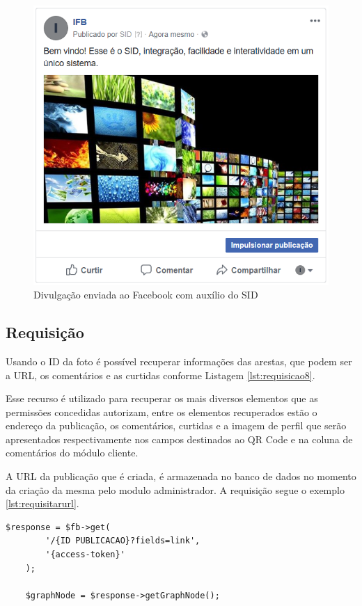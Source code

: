 \begin{figure}[H]
\centering
\includegraphics[scale=0.8]{figuras/imgfacebook1}
\caption{Divulgação enviada ao Facebook com auxílio do SID}
\label{fig:imgfacebook1}
\end{figure}


\subsection{Requisição}
Usando o ID da foto é possível recuperar informações das arestas, que podem ser a URL, os comentários e as curtidas conforme Listagem \ref{lst:requisicao8}. 

Esse recurso é utilizado para recuperar os mais diversos elementos que as permissões concedidas autorizam, entre os elementos recuperados estão o endereço da publicação, os comentários, curtidas e a imagem de perfil que serão apresentados respectivamente nos campos destinados ao QR Code e na coluna de comentários do módulo cliente.

A URL da publicação que é criada, é armazenada no banco de dados no momento da criação da mesma pelo modulo administrador. A requisição segue o exemplo \ref{lst:requisitarurl}.

\begin{lstlisting}[caption={Foto de usuário},label={lst:requisitarurl}]
  	$response = $fb->get(
    	'/{ID PUBLICACAO}?fields=link',
		'{access-token}'
	);
	
	$graphNode = $response->getGraphNode();
\end{lstlisting}

